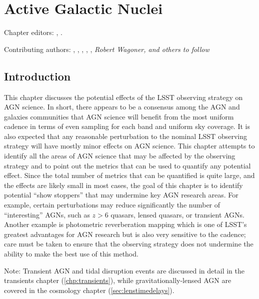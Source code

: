
\chapter[AGN]{Active Galactic Nuclei}
\def\chpname{agn}\label{chp:\chpname}

Chapter editors:
,
.

Contributing authors:
,
,
,
,
,
{\it Robert Wagoner, and others to follow}


\section{Introduction}
\label{sec:\chpname:intro}


This chapter discusses the potential effects of the LSST observing
strategy on AGN science. In short, there appears to be a consensus
among the AGN and galaxies communities that AGN science will benefit
from the most uniform cadence in terms of even sampling for each band
and uniform sky coverage. It is also expected that any reasonable
perturbation to the nominal LSST observing strategy will have mostly
minor effects on AGN science. This chapter attempts to identify all
the areas of AGN science that may be affected by the observing strategy
and to point out the metrics that can be used to quantify any potential
effect. Since the total number of metrics that can be quantified is
quite large, and the effects are likely small in most cases, the goal
of this chapter is to identify potential ``show stoppers'' that may undermine
key AGN research areas. For example, certain perturbations may reduce
significantly the number of ``interesting'' AGNs, such as $z>6$ quasars,
lensed quasars, or transient AGNs. Another example is photometric
reverberation mapping which is one of LSST's greatest advantages for
AGN research but is also very sensitive to the cadence; care must be
taken to ensure that the observing strategy does not undermine the
ability to make the best use of this method.

Note: Transient AGN and tidal disruption events are discussed in
detail in the transients chapter
(\autoref{chp:transients}), while gravitationally-lensed AGN are
covered in the cosmology chapter (\autoref{sec:lenstimedelays}).



